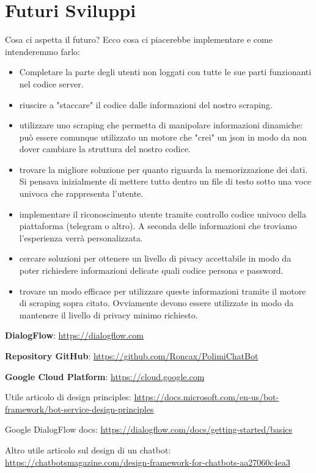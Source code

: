 \documentclass[]{article}
\begin{document}
\section{Futuri Sviluppi}
Cosa ci aspetta il futuro? Ecco cosa ci piacerebbe implementare e come intenderemmo farlo:
\begin{itemize}
\item Completare la parte degli utenti non loggati con tutte le sue parti funzionanti nel codice server.
\item riuscire a "staccare" il codice dalle informazioni del nostro scraping.
\item utilizzare uno scraping che permetta di manipolare informazioni dinamiche: può essere comunque utilizzato un motore che "crei" un json in modo da non dover cambiare la struttura del nostro codice.
\item trovare la migliore soluzione per quanto riguarda la memorizzazione dei dati. Si pensava inizialmente di mettere tutto dentro un file di testo sotto una voce univoca che rappresenta l'utente.
\item implementare il riconoscimento utente tramite controllo codice univoco della piattaforma (telegram o altro). A seconda delle informazioni che troviamo l'esperienza verrà personalizzata.
\item cercare soluzioni per ottenere un livello di pivacy accettabile in modo da poter richiedere informazioni delicate quali codice persona e password.
\item trovare un modo efficace per utilizzare queste informazioni tramite il motore di scraping sopra citato. Ovviamente devono essere utilizzate in modo da mantenere il livello di privacy minimo richiesto.
\end{itemize}

\begin{thebibliography}{9}
\textbf{DialogFlow}: \url{https://dialogflow.com}
 
\textbf{Repository GitHub}: \url{https://github.com/Roncax/PolimiChatBot}
 
\textbf{Google Cloud Platform}: \url{https://cloud.google.com}
 
Utile articolo di design principles: \url{https://docs.microsoft.com/en-us/bot-framework/bot-service-design-principles}

Google DialogFlow docs: \url{https://dialogflow.com/docs/getting-started/basics}

Altro utile articolo sul design di un chatbot: \url{https://chatbotsmagazine.com/design-framework-for-chatbots-aa27060c4ea3}

\end{thebibliography}
\end{document}
